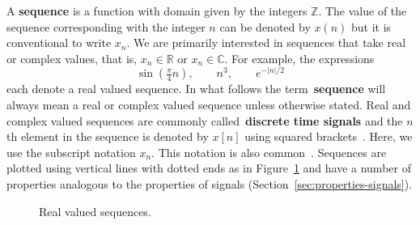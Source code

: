 \documentclass[11pt,a4paper]{book}
\theoremstyle{plain}
\numberwithin{equation}{section}
\newcommand{\reals}{{\mathbb R}}
\newcommand{\ints}{{\mathbb Z}}
\newcommand{\complex}{{\mathbb C}}
\newcommand{\term}{\textbf}
\newcommand{\sabs}[1]{\vert #1 \vert}
\begin{document}
A \term{sequence} is a function with domain given by the integers $\ints$.  The value of the sequence corresponding with the integer $n$ can be denoted by $x(n)$ but it is conventional to write $x_n$.  We are primarily interested in sequences that take real or complex values, that is, $x_n \in \reals$ or $x_n \in \complex$.  For example,  the expressions
\[
\sin( \tfrac{\pi}{4} n), \qquad n^3, \qquad e^{-\sabs{n}/2}
\]
each denote a real valued sequence.  In what follows the term~\term{sequence} will always mean a real or complex valued sequence unless otherwise stated.  Real and complex valued sequences are commonly called~\term{discrete time signals} and the $n$th element in the sequence is denoted by $x[n]$ using squared brackets~\citep{Oppenheiim_sigs_sys_1996}.  Here, we use the subscript notation $x_n$. This notation is also common~\citep{vetterli_fund_sig_proc,Rudin_real_and_complex_analysis}.
Sequences are plotted using vertical lines with dotted ends as in Figure~\ref{fig:realvaluedsequence} and have a number of properties analogous to the properties of signals (Section~\ref{sec:properties-signals}).

\begin{figure}[tp]
\centering
\def\minn{-4}
\def\maxn{4}
\def\scalex{0.6}
 \;\;
\caption{Real valued sequences.} \label{fig:realvaluedsequence}
\end{figure}
\end{document}
